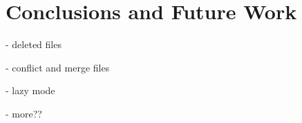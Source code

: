 \section{Conclusions and Future Work}
\label{sec:Conclusions}

- deleted files

- conflict and merge files

- lazy mode

- more??

